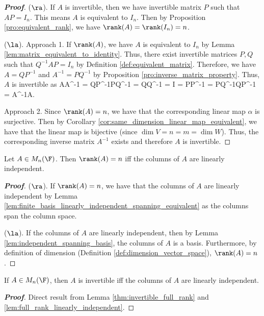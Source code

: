 \begin{proof}[\bf Proof]
($\ra$). If $A$ is invertible, then we have invertible matrix $P$ such that $AP = I_n$. This means $A$ is equivalent to $I_n$. Then by Proposition \ref{pro:equivalent_rank}, we have $\rank(A) =\rank(I_n) = n$.

($\la$). Approach 1. If $\rank(A)$, we have $A$ is equivalent to $I_n$ by Lemma \ref{lem:matrix_equivalent_to_identity}. Thus, there exist invertible matrices $P,Q$ such that $Q^{-1}AP = I_n$ by Definition \ref{def:equivalent_matrix}. Therefore, we have $A = QP^{-1}$ and $A^{-1} = PQ^{-1}$ by Proposition \ref{pro:inverse_matrix_property}. Thus, $A$ is invertible as
\be
AA^{-1} = QP^{-1}PQ^{-1} = QQ^{-1} = I = PP^{-1} = PQ^{-1}QP^{-1} = A^{-1}A.
\ee

Approach 2. Since $\rank(A) =n$, we have that the corresponding linear map $\alpha$ is surjective. Then by Corollary \ref{cor:same_dimension_linear_map_equivalent}, we have that the linear map is bijective (since $\dim V = n=m = \dim W$). Thus, the corresponding inverse matrix $A^{-1}$ exists and therefore $A$ is invertible.
\end{proof}

\begin{lemma}\label{lem:full_rank_linearly_independent}
Let $A\in M_n(\F)$. Then $\rank(A) = n$ iff the columns of $A$ are linearly independent.
\end{lemma}

\begin{proof}[\bf Proof]
($\ra$). If $\rank(A) = n$, we have that the columns of $A$ are linearly independent by Lemma \ref{lem:finite_basis_linearly_independent_spanning_equivalent} as the columns span the column space.

($\la$). If the columns of $A$ are linearly independent, then by Lemma \ref{lem:independent_spanning_basis}, the columns of $A$ is a basis. Furthermore, by definition of dimension (Definition \ref{def:dimension_vector_space}), $\rank(A) = n$.
\end{proof}

\begin{corollary}\label{cor:invertible_column_linearly_independent}
If $A\in M_n(\F)$, then $A$ is invertible iff the columns of $A$ are linearly independent.
\end{corollary}

\begin{proof}[\bf Proof]
Direct result from Lemma \ref{thm:invertible_full_rank} and \ref{lem:full_rank_linearly_independent}.
\end{proof}


